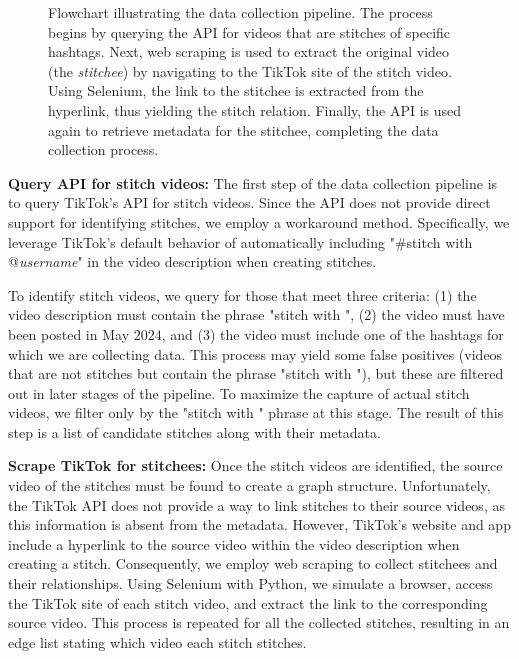\begin{figure}[H]
    \centering
    \begin{adjustwidth}{-\textwidth}{-\textwidth} %
        \centering
        
    \end{adjustwidth}
    \caption{Flowchart illustrating the data collection pipeline. The process begins by querying the API for videos that are stitches of specific hashtags. Next, web scraping is used to extract the original video (the \textit{stitchee}) by navigating to the TikTok site of the stitch video. Using Selenium, the link to the stitchee is extracted from the hyperlink, thus yielding the stitch relation. Finally, the API is used again to retrieve metadata for the stitchee, completing the data collection process.}
    \label{fig:data_flowchart}
\end{figure}

\textbf{Query API for stitch videos:} The first step of the data collection pipeline is to query TikTok's API for stitch videos. Since the API does not provide direct support for identifying stitches, we employ a workaround method. Specifically, we leverage TikTok's default behavior of automatically including "\#stitch with @\textit{username}" in the video description when creating stitches. 

To identify stitch videos, we query for those that meet three criteria: (1) the video description must contain the phrase "stitch with ", (2) the video must have been posted in May $2024$, and (3) the video must include one of the hashtags for which we are collecting data. This process may yield some false positives (videos that are not stitches but contain the phrase "stitch with "), but these are filtered out in later stages of the pipeline. To maximize the capture of actual stitch videos, we filter only by the "stitch with " phrase at this stage. The result of this step is a list of candidate stitches along with their metadata.

\textbf{Scrape TikTok for stitchees:} Once the stitch videos are identified, the source video of the stitches must be found to create a graph structure. Unfortunately, the TikTok API does not provide a way to link stitches to their source videos, as this information is absent from the metadata. However, TikTok's website and app include a hyperlink to the source video within the video description when creating a stitch. Consequently, we employ web scraping to collect stitchees and their relationships. Using Selenium with Python, we simulate a browser, access the TikTok site of each stitch video, and extract the link to the corresponding source video. This process is repeated for all the collected stitches, resulting in an edge list stating which video each stitch stitches. 

